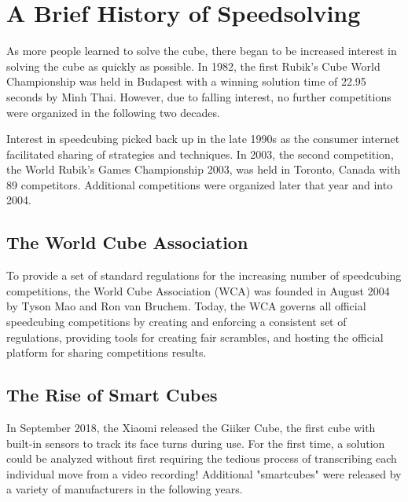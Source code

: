 \section{A Brief History of Speedsolving}
\label{sec:speedsolving}

As more people learned to solve the cube, there began to be increased
interest in solving the cube as quickly as possible. In 1982, the first
Rubik's Cube World Championship was held in Budapest with a winning
solution time of 22.95 seconds by Minh Thai. However, due to falling
interest, no further competitions were organized in the following two
decades.

Interest in speedcubing picked back up in the late 1990s as the
consumer internet facilitated sharing of strategies and techniques. In
2003, the second competition, the World Rubik's Games Championship
2003, was held in Toronto, Canada with 89 competitors. Additional
competitions were organized later that year and into 2004.
\cite{wca-speedcubing-history}

\subsection{The World Cube Association}
\label{subsec:the-world-cube-association}

To provide a set of standard regulations for the increasing number of
speedcubing competitions, the World Cube Association (WCA) was founded
in August 2004 by Tyson Mao and Ron van Bruchem. Today, the WCA governs
all official speedcubing competitions by creating and enforcing a
consistent set of regulations, providing tools for creating fair
scrambles, and hosting the official platform for sharing competitions
results. \cite{wca-speedcubing-history}

\subsection{The Rise of Smart Cubes}
\label{subsec:the-rise-of-smart-cubes}

In September 2018, the Xiaomi released the Giiker Cube, the first cube
with built-in sensors to track its face turns during use.
\cite{giiker-thecubicle} For the first time, a solution could be
analyzed without first requiring the tedious process of transcribing
each individual move from a video recording! Additional "smartcubes"
were released by a variety of manufacturers in the following years.
\cite{gocube-product-launch-video} \cite{gans356i-thecubicle}
\cite{gocube-rubiksconnected}

